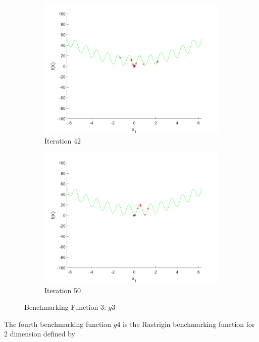 \begin{figure}
\begin{subfigure}[b]{0.4\textwidth}
    \includegraphics[width=\textwidth]{img/smpl/rast1d/loa-iter-42}
    \caption{Iteration 42}
    \label{fig:s3-iter-6}
  \end{subfigure}
  \begin{subfigure}[b]{0.4\textwidth}
    \includegraphics[width=\textwidth]{img/smpl/rast1d/loa-iter-50}
    \caption{Iteration 50}
    \label{fig:s3-iter-7}
  \end{subfigure}
  \caption{Benchmarking Function 3: $g3$}
\end{figure}

\par The fourth benchmarking function $g4$ is the Rastrigin benchmarking function for 2 dimension defined by

